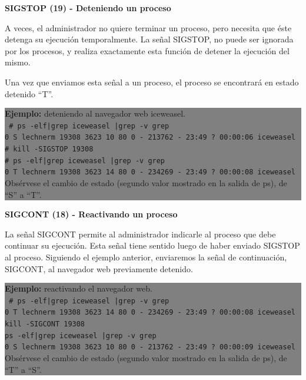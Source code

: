 \documentclass[12pt]{article}
\begin{document}
\textbf{SIGSTOP (19) - Deteniendo un proceso}

A veces, el administrador no quiere terminar un proceso, pero necesita
que éste detenga su ejecución temporalmente. La señal SIGSTOP, no puede
ser ignorada por los procesos, y realiza exactamente esta función de 
detener la ejecución del mismo. 

Una vez que enviamos esta señal a un proceso, el proceso se encontrará en 
estado detenido ``T''.


\colorbox{grey}{\parbox[t]{0.95\linewidth}{ \vspace*{0.5cm} { 
{\bf Ejemplo:} deteniendo al navegador web iceweasel. \\
{\tt
\# ps -elf|grep iceweasel |grep -v grep \\
0 S lechnerm 19308  3623 10  80   0 - 213762 -     23:49 ?    00:00:06 iceweasel \\

\# kill -SIGSTOP 19308 \\

\# ps -elf|grep iceweasel |grep -v grep \\
0 T lechnerm 19308  3623 14  80   0 - 234269 -     23:49 ?    00:00:08 iceweasel \\
}
Obsérvese el cambio de estado (segundo valor mostrado en la salida de ps), 
de ``S'' a ``T''. 
} \vspace*{0.5cm} } } 


\textbf{SIGCONT (18) - Reactivando un proceso}

La señal SIGCONT permite al administrador indicarle al proceso que debe 
continuar su ejecución. Esta señal tiene sentido luego de haber enviado 
SIGSTOP al proceso. Siguiendo el ejemplo anterior, enviaremos la señal de
continuación, SIGCONT, al navegador web previamente detenido.  


\colorbox{grey}{\parbox[t]{0.95\linewidth}{ \vspace*{0.5cm} { 
{\bf Ejemplo:} reactivando el navegador web. \\
{\tt
\# ps -elf|grep iceweasel |grep -v grep  \\
0 T lechnerm 19308  3623 14  80   0 - 234269 -     23:49 ?    00:00:08 iceweasel \\

kill -SIGCONT 19308 \\

ps -elf|grep iceweasel |grep -v grep  \\
0 S lechnerm 19308  3623 10  80   0 - 213762 -     23:49 ?    00:00:09 iceweasel \\
}
Obsérvese el cambio de estado (segundo valor mostrado en la salida de ps), 
de ``T'' a ``S''. 

} \vspace*{0.5cm} } }
\end{document}
